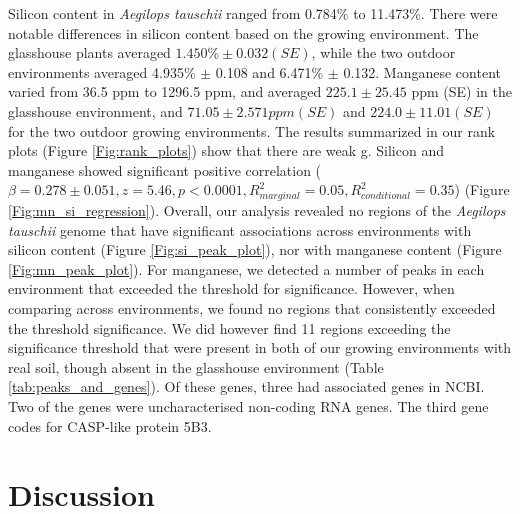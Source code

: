 \documentclass[12pt, letterpaper, ]{report}
\begin{document}
 Silicon content in \textit{Aegilops tauschii} ranged from 0.784\% to 11.473\%. There were notable differences in silicon content based on the growing environment. The glasshouse plants averaged $1.450\% \pm 0.032 (SE)$, while the two outdoor environments averaged 4.935\% $\pm$ 0.108 and 6.471\% $\pm$ 0.132. Manganese content varied from 36.5 ppm to 1296.5 ppm, and averaged $225.1 \pm 25.45$ ppm (SE) in the glasshouse environment, and $ 71.05 \pm 2.571 ppm (SE)$ and $ 224.0 \pm 11.01 (SE)$ for the two outdoor growing environments. The results summarized in our rank plots (Figure \ref{Fig:rank_plots}) show that there are weak g. Silicon and manganese showed significant positive correlation ($\beta = 0.278 \pm 0.051, z = 5.46, p<0.0001, R^2_{marginal} = 0.05, R^2_{conditional} = 0.35 $) (Figure \ref{Fig:mn_si_regression}). Overall, our analysis revealed no regions of the \textit{Aegilops tauschii} genome that have significant associations across environments with silicon content (Figure \ref{Fig:si_peak_plot}), nor with manganese content (Figure \ref{Fig:mn_peak_plot}). For manganese, we detected a number of peaks in each environment that exceeded the threshold for significance. However, when comparing across environments, we found no regions that consistently exceeded the threshold significance. We did however find 11 regions exceeding the significance threshold that were present in both of our growing environments with real soil, though absent in the glasshouse environment (Table \ref{tab:peaks_and_genes}). Of these genes, three had associated genes in NCBI. Two of the genes were uncharacterised non-coding RNA genes. The third gene codes for CASP-like protein 5B3. 

\section{Discussion}
\end{document}
